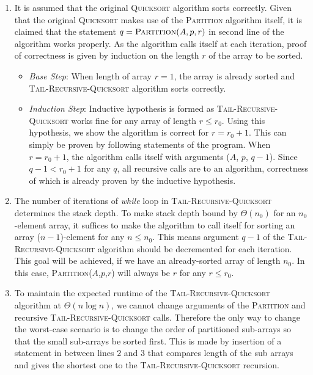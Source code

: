 \begin{enumerate}[label=(\alph*)]
\item It is assumed that the original \textsc{Quicksort} algorithm sorts correctly.
Given that the original \textsc{Quicksort} makes use of the \textsc{Partition} algorithm itself, it is claimed that the statement $q = \textsc{Partition}(A,p,r)$ in second line of the algorithm works properly.
As the algorithm calls itself at each iteration, proof of correctness is given by induction on the length $r$ of the array to be sorted.

\begin{itemize}
\item[] \emph{Base Step}: When length of array $r = 1$, the array is already sorted and \textsc{Tail-Recursive-Quicksort} algorithm sorts correctly.
\item[] \emph{Induction Step}: Inductive hypothesis is formed as \textsc{Tail-Recursive-Quicksort} works fine for any array of length $r \leq r_0$.
Using this hypothesis, we show the algorithm is correct for $r = r_0 + 1$.
This can simply be proven by following statements of the program.
When $r = r_0 + 1$, the algorithm calls itself with arguments ($A$, $p$, $q-1$).
Since $q - 1 < r_0+1$ for any $q$, all recursive calls are to an algorithm, correctness of which is already proven by the inductive hypothesis.
\end{itemize}

\item The number of iterations of \textit{while} loop in \textsc{Tail-Recursive-Quicksort} determines the stack depth.
To make stack depth bound by $\Theta(n_0)$ for an $n_0$-element array, it suffices to make the algorithm to call itself for sorting an array ($n-1$)-element for any $n \leq n_0$.
This means argument $q-1$ of the \textsc{Tail-Recursive-Quicksort} algorithm should be decremented for each iteration.
This goal will be achieved, if we have an already-sorted array of length $n_0$.
In this case, \textsc{Partition}($A$,$p$,$r$) will always be $r$ for any $r \leq r_0$.

\item To maintain the expected runtime of the \textsc{Tail-Recursive-Quicksort} algorithm at $\Theta(n \log n)$, we cannot change arguments of the \textsc{Partition} and recursive \textsc{Tail-Recursive-Quicksort} calls.
Therefore the only way to change the worst-case scenario is to change the order of partitioned sub-arrays so that the small sub-arrays be sorted first.
This is made by insertion of a statement in between lines $2$ and $3$ that compares length of the sub arrays and gives the shortest one to the \textsc{Tail-Recursive-Quicksort} recursion.

\end{enumerate}
